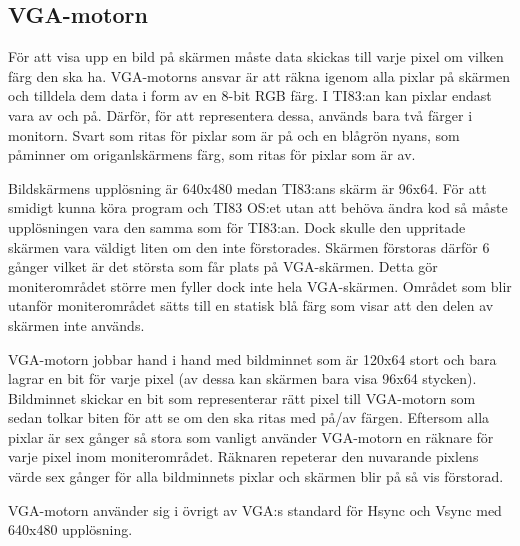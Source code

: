 \documentclass[main.tex]{subfiles}
\begin{document}
\subsection{VGA-motorn}

För att visa upp en bild på skärmen måste data skickas till varje pixel om
vilken färg den ska ha. VGA-motorns ansvar är att räkna igenom alla pixlar på
skärmen och tilldela dem data i form av en 8-bit RGB färg. I TI83:an kan pixlar
endast vara av och på. Därför, för att representera dessa, används bara två
färger i monitorn. Svart som ritas för pixlar som är på och en blågrön nyans,
som påminner om origanlskärmens färg, som ritas för pixlar som är av.

Bildskärmens upplösning är 640x480 medan TI83:ans skärm är 96x64. För att
smidigt kunna köra program och TI83 OS:et utan att behöva ändra kod så måste
upplösningen vara den samma som för TI83:an. Dock skulle den uppritade skärmen
vara väldigt liten om den inte förstorades. Skärmen förstoras därför 6 gånger
vilket är det största som får plats på VGA-skärmen. Detta gör moniterområdet
större men fyller dock inte hela VGA-skärmen. Området som blir utanför
moniterområdet sätts till en statisk blå färg som visar att den delen av
skärmen inte används. 

VGA-motorn jobbar hand i hand med bildminnet som är 120x64 stort och bara
lagrar en bit för varje pixel (av dessa kan skärmen bara visa 96x64 stycken).
Bildminnet skickar en bit som representerar rätt pixel till VGA-motorn som
sedan tolkar biten för att se om den ska ritas med på/av färgen. Eftersom alla
pixlar är sex gånger så stora som vanligt använder VGA-motorn en räknare för
varje pixel inom moniterområdet. Räknaren repeterar den nuvarande pixlens värde
sex gånger för alla bildminnets pixlar och skärmen blir på så vis förstorad.
 
VGA-motorn använder sig i övrigt av VGA:s standard för Hsync och Vsync med
640x480 upplösning. \cite{vgastd} 
\end{document}
